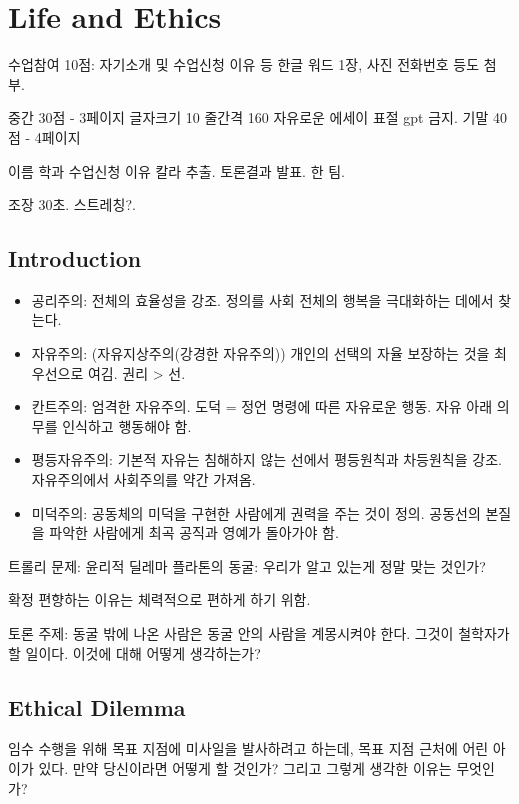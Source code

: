 \chapter{Life and Ethics}

수업참여 10점: 자기소개 및 수업신청 이유 등
한글 워드 1장, 사진 전화번호 등도 첨부.

중간 30점 - 3페이지 글자크기 10 줄간격 160 자유로운 에세이 표절 gpt 금지.
기말 40점 - 4페이지

이름 학과 수업신청 이유 칼라 추출.
토론결과 발표. 한 팀.

조장 30초. 스트레칭?.

\section{Introduction}

\begin{itemize}
  \item 공리주의: 전체의 효율성을 강조. 정의를 사회 전체의 행복을 극대화하는
        데에서 찾는다.
  \item 자유주의: (자유지상주의(강경한 자유주의)) 개인의 선택의 자율 보장하는
        것을 최우선으로 여김. 권리 > 선.
  \item 칸트주의: 엄격한 자유주의. 도덕 = 정언 명령에 따른 자유로운 행동. 자유
        아래 의무를 인식하고 행동해야 함.
  \item 평등자유주의: 기본적 자유는 침해하지 않는 선에서 평등원칙과 차등원칙을 강조.
        자유주의에서 사회주의를 약간 가져옴.
  \item 미덕주의: 공동체의 미덕을 구현한 사람에게 권력을 주는 것이 정의.
        공동선의 본질을 파악한 사람에게 최곡 공직과 영예가 돌아가야 함.
\end{itemize}

트롤리 문제: 윤리적 딜레마
플라톤의 동굴: 우리가 알고 있는게 정말 맞는 것인가?

확정 편향하는 이유는 체력적으로 편하게 하기 위함.

토론 주제: 동굴 밖에 나온 사람은 동굴 안의 사람을 계몽시켜야 한다. 그것이 철학자가 할 일이다.
이것에 대해 어떻게 생각하는가?

\section{Ethical Dilemma}

\begin{exercise}
  임수 수행을 위해 목표 지점에 미사일을 발사하려고 하는데, 목표 지점 근처에 어린
  아이가 있다. 만약 당신이라면 어떻게 할 것인가? 그리고 그렇게 생각한 이유는
  무엇인가?
\end{exercise}

